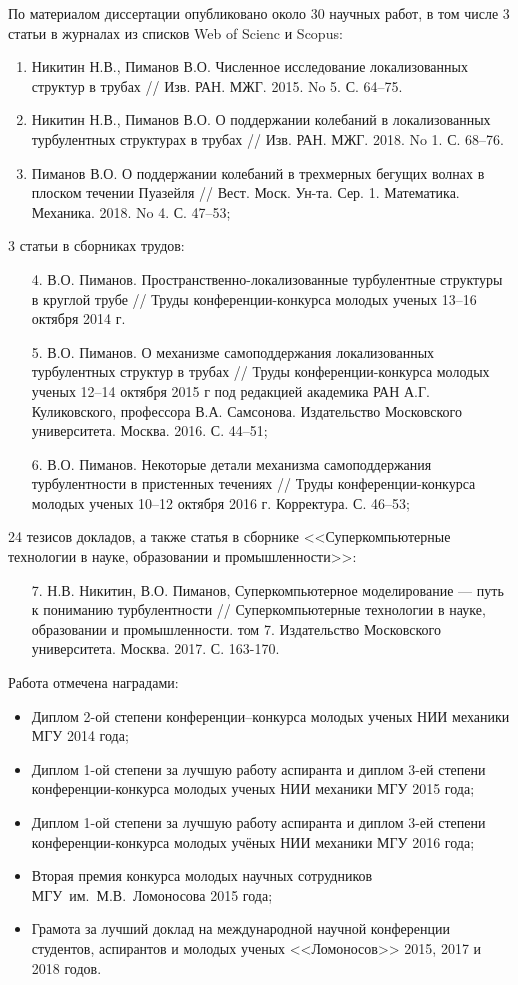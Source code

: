 По материалом диссертации опубликовано около 30 научных работ, в том числе 3 статьи в журналах из списков Web of Scienc и Scopus:
\begin{enumerate}
\item Никитин Н.В., Пиманов В.О. Численное исследование локализованных структур в трубах // Изв. РАН. МЖГ. 2015. No 5. С. 64--75.
\item Никитин Н.В., Пиманов В.О. О поддержании колебаний в локализованных турбулентных структурах в трубах // Изв. РАН. МЖГ. 2018. No 1. С. 68--76.
\item Пиманов В.О. О поддержании колебаний в трехмерных бегущих волнах в плоском течении Пуазейля // Вест. Моск. Ун-та. Сер. 1. Математика. Механика. 2018. No 4. С. 47--53;
\end{enumerate}
3 статьи в сборниках трудов:
\begin{enumerate}
\item[4.] В.О. Пиманов. Пространственно-локализованные турбулентные структуры в круглой трубе // Труды конференции-конкурса молодых ученых 13--16 октября 2014 г.
\item[5.] В.О. Пиманов. О механизме самоподдержания локализованных турбулентных структур в трубах // Труды конференции-конкурса молодых ученых 12--14 октября 2015 г под редакцией академика РАН А.Г. Куликовского, профессора В.А. Самсонова. Издательство Московского университета. Москва. 2016. С. 44--51; 
\item[6.] В.О. Пиманов. Некоторые детали механизма самоподдержания турбулентности в пристенных течениях // Труды конференции-конкурса молодых ученых 10--12 октября 2016 г. Корректура. С. 46--53;
\end{enumerate} 
24 тезисов докладов, а также статья в сборнике <<Суперкомпьютерные технологии в науке, образовании и промышленности>>:
\begin{enumerate}
\item[7.] Н.В. Никитин, В.О. Пиманов, Суперкомпьютерное моделирование --- путь к пониманию турбулентности // Суперкомпьютерные технологии в науке, образовании и промышленности. том 7. Издательство Московского университета. Москва. 2017. С.  163-170. 
\end{enumerate}
Работа отмечена наградами:
\begin{itemize}
\item Диплом 2-ой степени конференции--конкурса молодых ученых НИИ механики МГУ 2014 года;
\item Диплом 1-ой степени за лучшую работу аспиранта и диплом 3-ей степени конференции-конкурса молодых ученых НИИ механики МГУ 2015 года;
\item Диплом 1-ой степени за лучшую работу аспиранта и диплом 3-ей степени конференции-конкурса молодых учёных НИИ механики МГУ 2016 года;
\item Вторая премия конкурса молодых научных сотрудников МГУ~им.~М.В.~Ломоносова 2015 года;
\item Грамота за лучший доклад на международной научной конференции студентов, аспирантов и молодых ученых <<Ломоносов>> 2015, 2017 и 2018 годов.
\end{itemize}


